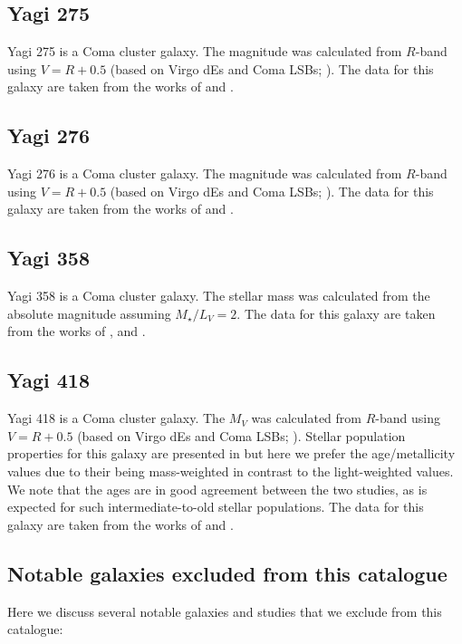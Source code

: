 \subsection{Yagi 275}
Yagi 275 is a Coma cluster galaxy. The magnitude was calculated from $R$-band using $V = R + 0.5$ (based on Virgo dEs and Coma LSBs; \citealp{vanZee2004, Alabi2020}). The data for this galaxy are taken from the works of \citet{Yagi2016, Alabi2018, Chilingarian2019} and \citet{FerreMateu2018}. 

\subsection{Yagi 276}
Yagi 276 is a Coma cluster galaxy. The magnitude was calculated from $R$-band using $V = R + 0.5$ (based on Virgo dEs and Coma LSBs; \citealp{vanZee2004, Alabi2020}). The data for this galaxy are taken from the works of \citet{Yagi2016, Alabi2018} and \citet{FerreMateu2018}. 

\subsection{Yagi 358}
Yagi 358 is a Coma cluster galaxy. The stellar mass was calculated from the absolute magnitude assuming $M_{\star} / L_{V} =2$. The data for this galaxy are taken from the works of \citet{vanDokkum2017}, \citet{Lim2018} and \citet{Gannon2023}.  

\subsection{Yagi 418}
Yagi 418 is a Coma cluster galaxy. The $M_V$ was calculated from $R$-band using $V = R + 0.5$ (based on Virgo dEs and Coma LSBs; \citealp{vanZee2004, Alabi2020}). Stellar population properties for this galaxy are presented in \cite{RuizLara2018} but here we prefer the \cite{FerreMateu2023} age/metallicity values due to their being mass-weighted in contrast to the \citet{RuizLara2018} light-weighted values. We note that the ages are in good agreement between the two studies, as is expected for such intermediate-to-old stellar populations. The data for this galaxy are taken from the works of \citet{Yagi2016, Alabi2018} and \citet{FerreMateu2018}. 

\subsection{Notable galaxies excluded from this catalogue}
Here we discuss several notable galaxies and studies that we exclude from this catalogue:

